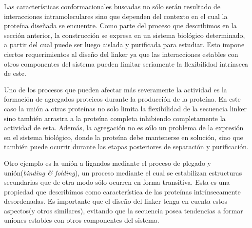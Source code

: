 Las características conformacionales buscadas no sólo serán resultado de interacciones intramoleculares sino que dependen del contexto en el cual la proteína diseñada se encuentre. 
Como parte del proceso que describimos en la sección anterior, la construcción se expresa en un sistema biológico determinado, a partir del cual puede ser luego aislada y purificada para estudiar. 
Esto impone ciertos requerimientos al diseño del linker ya que las interacciones estables con otros componentes del sistema pueden limitar seriamente la flexibilidad intrínseca de este.

Uno de los procesos que pueden afectar más severamente la actividad es la formación de agregados proteicos durante la producción de la proteína\cite{lebendiker2014production}.
En este caso la unión a otras proteínas no solo limita la flexibilidad de la secuencia linker sino también arrastra a la proteína completa inhibiendo completamente la actividad de esta.
Además, la agregación no es sólo un problema de la expresión en el sistema biológico, donde la proteína debe mantenerse en solución,
sino que también puede ocurrir durante las etapas posteriores de separación y purificación.

Otro ejemplo es la uníón a ligandos mediante el proceso de plegado y unión(\textit{binding \& folding}), un proceso mediante el cual se estabilizan estructuras secundarias que de otra modo sólo ocurren en forma transitiva.  
Esta es una propiedad que describimos como característica de las proteínas intrínsecamente desordenadas.
Es importante que el diseño del linker tenga en cuenta estos aspectos(y otros similares), evitando que la secuencia posea tendencias a formar uniones estables con otros componentes del sistema.



